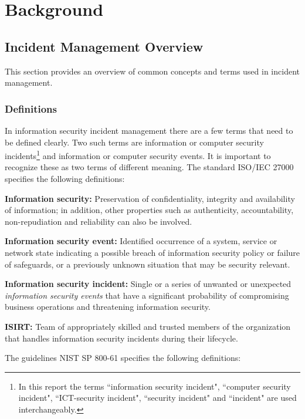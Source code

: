 \chapter{Background}
\label{chp:background}

\section{Incident Management Overview}
This section provides an overview of common concepts and terms used in incident management.
\subsection{Definitions}
\label{sec:Definitions}
In information security incident management there are a few terms that need to be defined clearly. Two such terms are information or computer security incidents\footnote{In this report the terms ``information security incident", ``computer security incident", ``ICT-security incident", ``security incident" and ``incident" are used interchangeably.} %
and information or computer security events. It is important to recognize these as two terms of different meaning. The standard \acs{ISO}/\acs{IEC} 27000 \cite{ISO/IEC27000} specifies the following definitions:

\textbf{Information security:} Preservation of confidentiality, integrity and availability of information; in addition, other properties such as authenticity, accountability, non-repudiation and reliability can also be involved.

\textbf{Information security event:} Identified occurrence of a system, service or network state indicating a possible breach of information security policy or failure of safeguards, or a previously unknown situation that may be security relevant.

\textbf{Information security incident:} Single or a series of unwanted or unexpected \emph{information security events} that have a significant probability of compromising business operations and threatening information security.

\textbf{\ac{ISIRT}:} Team of appropriately skilled and trusted members of the organization that handles information security incidents during their lifecycle.

The guidelines \acs{NIST} SP 800-61 \cite{nist800-61} specifies the following definitions:

